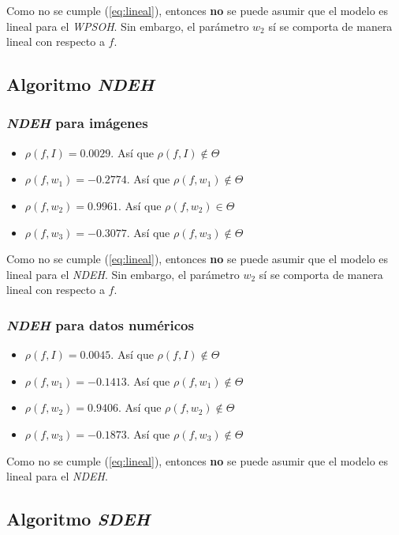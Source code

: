     Como no se cumple (\ref{eq:lineal}), entonces \textbf{no} se puede asumir
que el modelo es lineal para el \emph{WPSOH}. Sin embargo, el parámetro $w_2$ sí
se comporta de manera lineal con respecto a $f$.

\subsection{Algoritmo \emph{NDEH}}

\subsubsection{\emph{NDEH} para imágenes}
\begin{itemize}
    \item $\rho(f, I) = 0.0029$. Así que $\rho(f, I) \notin \Theta$
    \item $\rho(f, w_1) = -0.2774$. Así que $\rho(f, w_1) \notin \Theta$
    \item $\rho(f, w_2) = 0.9961$. Así que $\rho(f, w_2) \in \Theta$
    \item $\rho(f, w_3) = -0.3077$. Así que $\rho(f, w_3) \notin \Theta$
\end{itemize}

    Como no se cumple (\ref{eq:lineal}), entonces \textbf{no} se puede asumir
que el modelo es lineal para el \emph{NDEH}. Sin embargo, el parámetro $w_2$ sí
se comporta de manera lineal con respecto a $f$.

\subsubsection{\emph{NDEH} para datos numéricos}
\begin{itemize}
    \item $\rho(f, I) = 0.0045$. Así que $\rho(f, I) \notin \Theta$
    \item $\rho(f, w_1) = -0.1413$. Así que $\rho(f, w_1) \notin \Theta$
    \item $\rho(f, w_2) = 0.9406$. Así que $\rho(f, w_2) \notin \Theta$
    \item $\rho(f, w_3) = -0.1873$. Así que $\rho(f, w_3) \notin \Theta$
\end{itemize}

    Como no se cumple (\ref{eq:lineal}), entonces \textbf{no} se puede asumir
que el modelo es lineal para el \emph{NDEH}.

\subsection{Algoritmo \emph{SDEH}}

